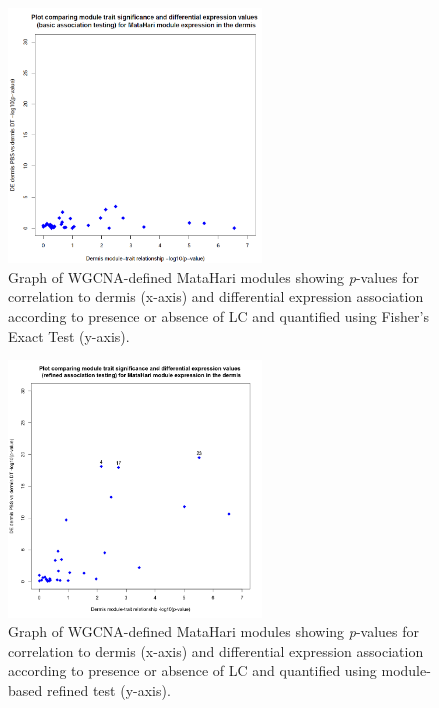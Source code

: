 \begin{figure}[H] 
    \centering
\includegraphics[width=0.6\textwidth]{Figures/Chapter5/Dermis_trait_vs_DE_BASIC.png}
\caption{\small{Graph of WGCNA-defined MataHari modules showing \textit{p}-values for correlation to dermis (x-axis) and differential expression association according to presence or absence of LC and quantified using Fisher's Exact Test (y-axis).} }
    \label{fig:23}
\end{figure}


\begin{figure}[H] 
    \centering
\includegraphics[width=0.6\textwidth]{Figures/Chapter5/Dermis_trait_vs_DE.png}
\caption{\small{Graph of WGCNA-defined MataHari modules showing \textit{p}-values for correlation to dermis (x-axis) and differential expression association according to presence or absence of LC and quantified using module-based refined test (y-axis).} }
    \label{fig:24}
\end{figure}

